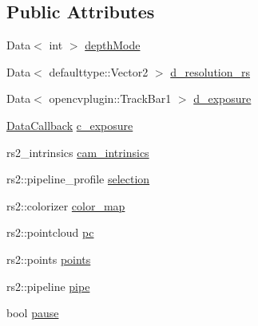 \subsection*{Public Attributes}
\begin{DoxyCompactItemize}
\item 
Data$<$ int $>$ \hyperlink{classsofa_1_1rgbdtracking_1_1_real_sense_cam_a44e727c66935e408f2ba4de6e0699b6b}{depth\+Mode}
\item 
Data$<$ defaulttype\+::\+Vector2 $>$ \hyperlink{classsofa_1_1rgbdtracking_1_1_real_sense_cam_a3c62e27c86ce60e15cc8b520fe576994}{d\+\_\+resolution\+\_\+rs}
\item 
Data$<$ opencvplugin\+::\+Track\+Bar1 $>$ \hyperlink{classsofa_1_1rgbdtracking_1_1_real_sense_cam_ad605d7bbc20faee2b716df53474412dc}{d\+\_\+exposure}
\item 
\hyperlink{namespacesofa_1_1rgbdtracking_a00834a9204a667746fef9a402ccbfb55}{Data\+Callback} \hyperlink{classsofa_1_1rgbdtracking_1_1_real_sense_cam_a67ec547de6f69bebef2a7f2e8d584f48}{c\+\_\+exposure}
\item 
rs2\+\_\+intrinsics \hyperlink{classsofa_1_1rgbdtracking_1_1_real_sense_cam_a07b608dff4127a1ea22ffcc93a0a2b8b}{cam\+\_\+intrinsics}
\item 
rs2\+::pipeline\+\_\+profile \hyperlink{classsofa_1_1rgbdtracking_1_1_real_sense_cam_a9c40355cbe2db5d7ccd20a6ff3d6c8d2}{selection}
\item 
rs2\+::colorizer \hyperlink{classsofa_1_1rgbdtracking_1_1_real_sense_cam_a8763304f41d3eb3ecd0a9c8fc92a1bac}{color\+\_\+map}
\item 
rs2\+::pointcloud \hyperlink{classsofa_1_1rgbdtracking_1_1_real_sense_cam_a622f15e0a08312b92571bd5c4d040ea1}{pc}
\item 
rs2\+::points \hyperlink{classsofa_1_1rgbdtracking_1_1_real_sense_cam_a4fbb2690c02fea1635913680e08efd7b}{points}
\item 
rs2\+::pipeline \hyperlink{classsofa_1_1rgbdtracking_1_1_real_sense_cam_a630e600956571e553972403bba7fcf02}{pipe}
\item 
bool \hyperlink{classsofa_1_1rgbdtracking_1_1_real_sense_cam_a9fce91c3e7d2c1be3aaca521ea28d14f}{pause}
\end{DoxyCompactItemize}
